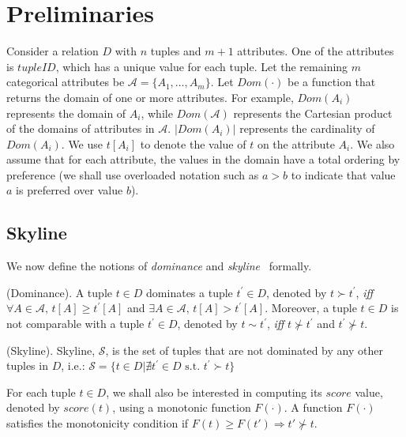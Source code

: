 \section{Preliminaries}\label{sec:preliminaries}
Consider a relation $D$ with $n$ tuples and $m+1$ attributes. 
One of the attributes is $tupleID$, which has a unique value for each tuple.
Let the remaining $m$ categorical attributes be $\mathcal{A}=\{A_1,\dots ,A_m\}$. 
Let $Dom(\cdot)$ be a function that returns the domain of one or more attributes. For example, $Dom(A_i)$ represents the
domain of $A_i$, while $Dom(\mathcal{A})$ represents the Cartesian product
of the domains of attributes in $\mathcal{A}$. $|Dom(A_i)|$ represents the cardinality of $Dom(A_i)$. We use $t[A_i]$ to denote the value of $t$ on the attribute $A_i$.  
We also assume that for each attribute, the values in the domain have a total ordering by preference
(we shall  use overloaded notation such as $a > b$ to indicate that value $a$ is preferred over value $b$).

\subsection{Skyline}
We now define the notions of \textit{dominance} %
and \textit{skyline}~\cite{borzsony2001skyline} formally. 

\begin{definition}{(Dominance).}
A tuple $t\in D$ dominates a tuple $t^\prime\in D$, denoted by $t \succ t^\prime$, {\it iff} $\forall A\in\mathcal{A},\, t[A] \geq t^\prime[A]$ and $\exists A \in \mathcal{A}, \, t[A] > t^\prime[A]$.
Moreover, a tuple $t\in D$ is not comparable with a tuple $t^\prime\in D$, denoted by $t \sim t^\prime$, {\it iff} $t \nsucc t^\prime$ and $t^\prime \nsucc t$.
\end{definition}

\begin{definition}{(Skyline).}
Skyline, $\mathcal{S}$, is the set of tuples  that are not dominated by any other tuples in $D$, i.e.: $\mathcal{S} = \{t\in D|\nexists t^\prime \in D \mbox{ s.t. } t^\prime \succ t\}$
\end{definition}

For each tuple $t \in D$, we shall also be interested in computing its $score$ value, denoted by $score(t)$, using a monotonic function $F(\cdot)$. A function $F(\cdot)$ satisfies the monotonicity condition if $F(t) \geq F(t') \Rightarrow t' \nsucc t$.

